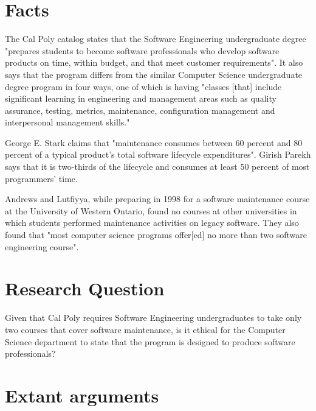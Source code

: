 \documentclass[11pt]{article}
\begin{document}
\begin{multicols}{2}
\setcounter{page}{1}
\section{Facts}

The Cal Poly catalog states that the Software Engineering undergraduate degree "prepares students to become software professionals who develop software 
products on time, within budget, and that meet customer requirements". \cite{catalogDept}  It also says that the program differs from the similar Computer Science undergraduate degree program in four ways, one of which is having "classes [that] include significant learning in engineering and management areas such as quality assurance, testing, metrics, maintenance, configuration management and interpersonal management skills." \cite{catalogDept}

George E. Stark claims that "maintenance consumes between 60 percent and 80 percent of a typical product's total software lifecycle expenditures". \cite{stark97}  Girish Parekh says that it is two-thirds of the lifecycle and consumes at least 50 percent of most programmers' time. \cite{parekh}

Andrews and Lutfiyya, while preparing in 1998 for a software maintenance course at the University of Western Ontario, found no courses at other universities in which students performed maintenance activities on legacy software. \cite{Andrews:2000:ERS:794188.794320} They also found that "most computer science programs offer[ed] no more than two software engineering course". \cite{Andrews:2000:ERS:794188.794320}

\section{Research Question}
Given that Cal Poly requires Software Engineering undergraduates to take only two courses that cover software maintenance, is it ethical for the Computer Science department to state that the program is designed to produce software professionals?

\section{Extant arguments}


\end{multicols}
\end{document}
